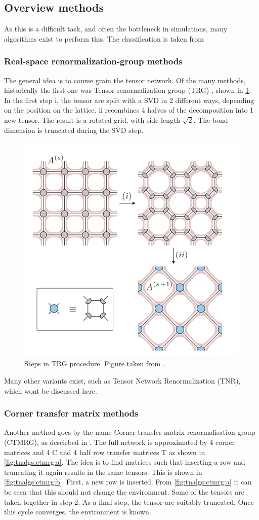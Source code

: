 \subsection{Overview methods}

As this is a difficult task, and often the bottleneck in simulations, many algorithms exist to perform this. The classification is taken from \cite{Nietner2020}

\subsubsection{Real-space renormalization-group methods}

The general idea is to course grain the tensor network. Of the many methods, historically the first one was Tensor renormalization group (TRG)  \cite{Hauru}, shown in \cref{fig:tnalgs:trg}. In the first step i, the tensor are split with a SVD in 2 different ways, depending on the position on the lattice. ii recombines 4 halves of the decomposition into 1 new tensor. The result is a rotated grid, with side length $\sqrt{2}$. The bond dimension is truncated during the SVD step.

\begin{figure}
  \center
  \includegraphics[width=0.5 \textwidth]{Figuren/tnalgs/TRG.png}
  \caption{ Steps in TRG procedure. Figure taken from \cite{Hauru}.  }
  \label{fig:tnalgs:trg}
\end{figure}

Many other variants exist, such as Tensor Network Renormalization (TNR), which wont be discussed here.

\subsubsection{Corner transfer matrix  methods}

Another method goes by the name Corner transfer matrix renormalisation group (CTMRG), as descirbed in \cite{orus}. The full network is approximated by 4 corner matrices and 4 C and 4 half row transfer matrices T as shown in \cref{fig:tnalgs:ctmrg:a}. The idea is to find matrices such that inserting a row and truncating it again results in the same tensors. This is shown in \cref{fig:tnalgs:ctmrg:b}. First, a new row is inserted. From \cref{fig:tnalgs:ctmrg:a} it can be seen that this should not change the environment. Some of the tensors are taken together in step 2. As a final step, the tensor are suitably truncated. Once this cycle converges, the environment is known.

